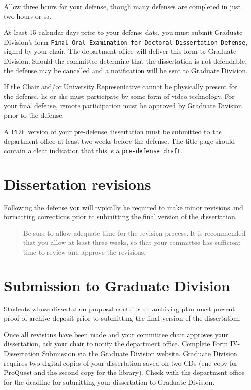 \documentclass[
]{book}
\begin{document}
Allow three hours for your defense, though many defenses are completed in just two hours or so.

At least 15 calendar days prior to your defense date, you must submit Graduate Division's form \texttt{Final\ Oral\ Examination\ for\ Doctoral\ Dissertation\ Defense}, signed by your chair. The department office will deliver this form to Graduate Division. Should the committee determine that the dissertation is not defendable, the defense may be cancelled and a notification will be sent to Graduate Division.

If the Chair and/or University Representative cannot be physically present for the defense, he or she must participate by some form of video technology. For your final defense, remote participation must be approved by Graduate Division prior to the defense.

A PDF version of your pre-defense dissertation must be submitted to the department office at least two weeks before the defense. The title page should contain a clear indication that this is a \texttt{pre-defense\ draft}.

\section{Dissertation revisions}\label{dissertation-revisions}

Following the defense you will typically be required to make minor revisions and formatting corrections prior to submitting the final version of the dissertation.

\begin{quote}
Be sure to allow adequate time for the revision process. It is recommended that you allow at least three weeks, so that your committee has sufficient time to review and approve the revisions.
\end{quote}

\section{Submission to Graduate Division}\label{submission-to-graduate-division}

Students whose dissertation proposal contains an \label{archiving}{archiving plan} must present proof of archive deposit prior to submitting the final version of the dissertation.

Once all revisions have been made and your committee chair approves your dissertation, ask your chair to notify the department office. Complete Form IV-Dissertation Submission via the \href{https://manoa.hawaii.edu/graduate/forms/}{Graduate Division website}. Graduate Division requires two digital copies of your dissertation saved on two CDs (one copy for ProQuest and the second copy for the library). Check with the department office for the deadline for submitting your dissertation to Graduate Division.
\end{document}
